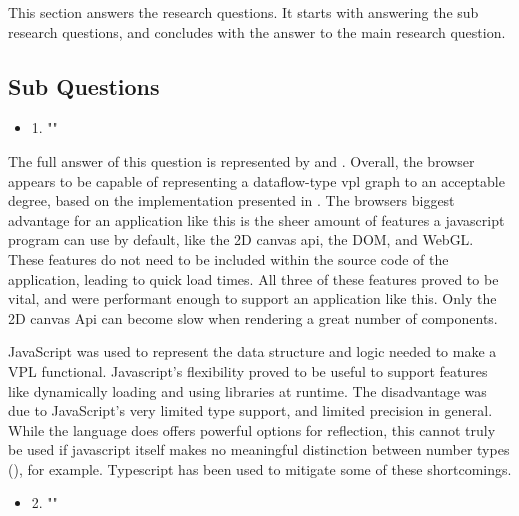 This section answers the research questions. 
It starts with answering the sub research questions, and concludes with the answer to the main research question.

\subsection*{Sub Questions}

\begin{itemize}[ ]
  \item 1. "\mySubRQOne"
\end{itemize}

The full answer of this question is represented by  and .
Overall, the browser appears to be capable of representing a dataflow-type vpl graph to an acceptable degree, 
based on the implementation presented in .
The browsers biggest advantage for an application like this is the sheer amount of features a javascript program can use by default, like the 2D canvas api, the DOM, and WebGL. 
These features do not need to be included within the source code of the application, leading to quick load times. 
All three of these features proved to be vital, and were performant enough to support an application like this. 
Only the 2D canvas Api can become slow when rendering a great number of components. 

JavaScript was used to represent the data structure and logic needed to make a VPL functional. 
Javascript's flexibility proved to be useful to support features like dynamically loading and using libraries at runtime. 
The disadvantage was due to JavaScript's very limited type support, and limited precision in general. 
While the language does offers powerful options for reflection, this cannot truly be used if javascript itself makes no meaningful distinction between number types (), for example. 
Typescript has been used to mitigate some of these shortcomings.  

\begin{itemize}[ ]
  \item 2. "\mySubRQTwo"
\end{itemize}



